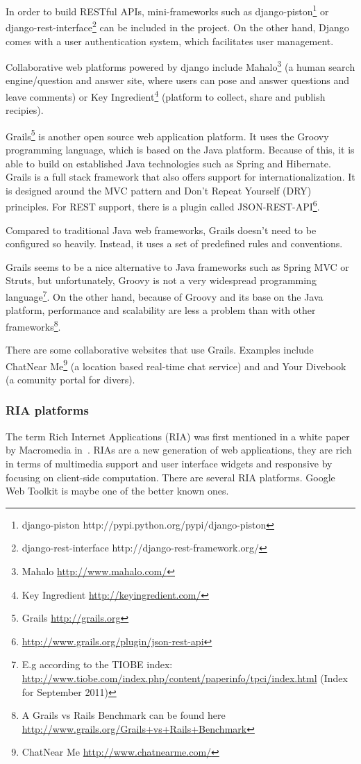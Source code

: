 In order to build RESTful APIs, mini-frameworks such as django-piston\footnote{django-piston http://pypi.python.org/pypi/django-piston} or django-rest-interface\footnote{django-rest-interface http://django-rest-framework.org/} can be included in the project. On the other hand, Django comes with a user authentication system, which facilitates user management. 

Collaborative web platforms powered by django include Mahalo\footnote{Mahalo \url{http://www.mahalo.com/}} (a human search engine/question and answer site, where users can pose and answer questions and leave comments) or Key Ingredient\footnote{Key Ingredient \url{http://keyingredient.com/}} (platform to collect, share and publish recipies).   

Grails\footnote{Grails \url{http://grails.org}} is another open source web application platform. It uses the Groovy programming language, which is based on the Java platform. Because of this, it is able to build on established Java technologies such as Spring and Hibernate. Grails is a full stack framework that also offers support for internationalization. It is designed around the MVC pattern and Don't Repeat Yourself (DRY) principles.
For REST support, there is a plugin called JSON-REST-API\footnote{\url{http://www.grails.org/plugin/json-rest-api}}.

Compared to traditional Java web frameworks, Grails doesn't need to be configured so heavily. Instead, it uses a set of predefined rules and conventions.

Grails seems to be a nice alternative to Java frameworks such as Spring MVC or Struts, but unfortunately, Groovy is not a very widespread programming language\footnote{E.g according to the TIOBE index: \url{http://www.tiobe.com/index.php/content/paperinfo/tpci/index.html} (Index for September 2011)}. On the other hand, because of Groovy and its base on the Java platform, performance and scalability are less a problem than with other frameworks\footnote{A Grails vs Rails Benchmark can be found here \url{http://www.grails.org/Grails+vs+Rails+Benchmark}}. 

There are some collaborative websites that use Grails. Examples include ChatNear Me\footnote{ChatNear Me \url{http://www.chatnearme.com/}} (a location based real-time chat service) and and Your Divebook (a comunity portal for divers).

\subsubsection{RIA platforms}
The term Rich Internet Applications (RIA) was first mentioned in a white paper by Macromedia in~\cite{ria}. RIAs are a new generation of web applications, they are rich in terms of multimedia support and user interface widgets and responsive by focusing on client-side computation.
There are several RIA platforms. Google Web Toolkit is maybe one of the better known ones. 
 
